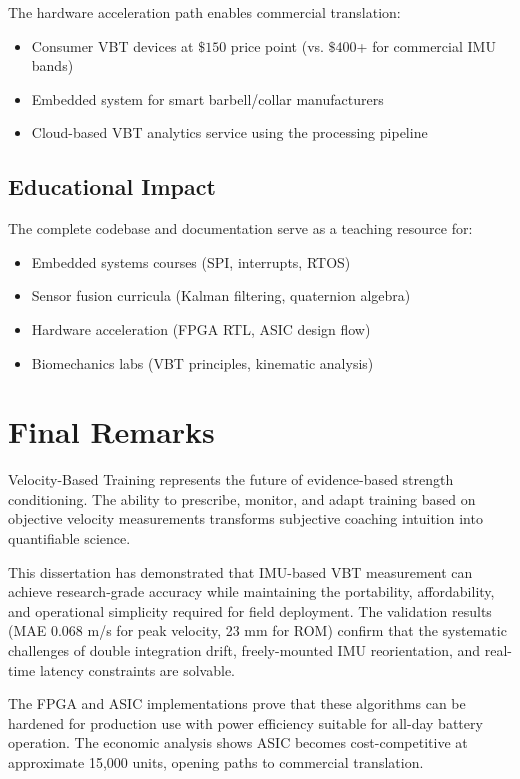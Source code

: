The hardware acceleration path enables commercial translation:
\begin{itemize}
    \item Consumer VBT devices at $\$150$ price point (vs. $\$400$+ for commercial IMU bands)
    \item Embedded system for smart barbell/collar manufacturers
    \item Cloud-based VBT analytics service using the processing pipeline
\end{itemize}

\subsection{Educational Impact}

The complete codebase and documentation serve as a teaching resource for:
\begin{itemize}
    \item Embedded systems courses (SPI, interrupts, RTOS)
    \item Sensor fusion curricula (Kalman filtering, quaternion algebra)
    \item Hardware acceleration (FPGA RTL, ASIC design flow)
    \item Biomechanics labs (VBT principles, kinematic analysis)
\end{itemize}

\section{Final Remarks}

Velocity-Based Training represents the future of evidence-based strength conditioning. The ability to prescribe, monitor, and adapt training based on objective velocity measurements transforms subjective coaching intuition into quantifiable science.

This dissertation has demonstrated that IMU-based VBT measurement can achieve research-grade accuracy while maintaining the portability, affordability, and operational simplicity required for field deployment. The validation results (MAE 0.068 m/s for peak velocity, 23 mm for ROM) confirm that the systematic challenges of double integration drift, freely-mounted IMU reorientation, and real-time latency constraints are solvable.

The FPGA and ASIC implementations prove that these algorithms can be hardened for production use with power efficiency suitable for all-day battery operation. The economic analysis shows ASIC becomes cost-competitive at approximate 15,000 units, opening paths to commercial translation.

